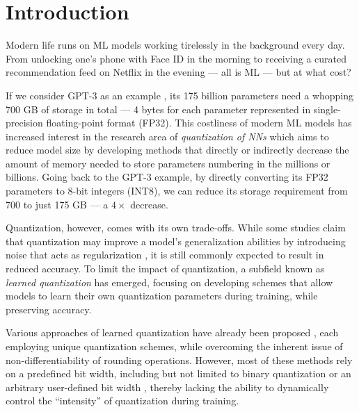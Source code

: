 \chapter{Introduction\label{cha:chapter1}}

\hspace*{1em}Modern life runs on ML models working tirelessly in the background every day. 
From unlocking one's phone with Face ID in the morning 
to receiving a curated recommendation feed on Netflix in the evening — 
all is ML — but at what cost?

If we consider GPT-3 as an example \cite{DBLP:journals/corr/abs-2005-14165}, 
its 175 billion parameters need a whopping 700 GB of storage in total —  
4 bytes for each parameter represented in single-precision floating-point format (FP32).
This costliness of modern ML models has increased interest in the research area
of \textit{quantization of NNs} 
which aims to reduce model size by developing methods 
that directly or indirectly decrease the amount of memory 
needed to store parameters numbering in the millions or billions. 
Going back to the GPT-3 example, 
by directly converting its FP32 parameters
to 8-bit integers (INT8), we can reduce its storage requirement 
from 700 to just 175 GB  — a \( 4 \times\) decrease. 

Quantization, however, comes with its own trade-offs. 
While some studies claim that quantization may improve a model's generalization abilities 
by introducing noise that acts as regularization \cite{courbariaux2015binaryconnect}, 
it is still commonly expected to result in reduced accuracy.
To limit the impact of quantization, 
a subfield known as \textit{learned quantization} has emerged, 
focusing on developing schemes that allow models to learn their own quantization parameters
during training, while preserving accuracy.

Various approaches of learned quantization have already been proposed \cite{DBLP:conf/cvpr/JungSLSHKHC19, DBLP:conf/iclr/EsserMBAM20, DBLP:conf/eccv/ZhangYYH18, shuchang2016dorafenet}, 
each employing unique quantization schemes, while overcoming the inherent issue of non-differentiability of rounding operations. 
However, most of these methods rely on a predefined bit width, 
including but not limited to binary quantization \cite{DBLP:conf/nips/HubaraCSEB16, rastegari2016xnor, courbariaux2015binaryconnect} 
or an arbitrary user-defined bit width \cite{shuchang2016dorafenet}, 
thereby lacking the ability to dynamically control the “intensity” of quantization during training.

